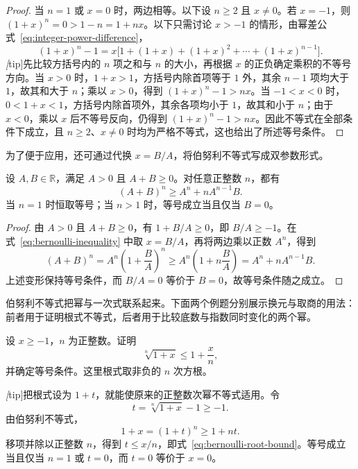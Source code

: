 \begin{proof}
当 $n=1$ 或 $x=0$ 时，两边相等。以下设 $n\geq2$ 且 $x\neq0$。若 $x=-1$，则 $(1+x)^n=0>1-n=1+nx$。以下只需讨论 $x>-1$ 的情形，由幂差公式~\eqref{eq:integer-power-difference}，
\[
    (1+x)^n-1
    =x\bigl[1+(1+x)+(1+x)^2+\cdots+(1+x)^{n-1}\bigr].
\]
\emph[tip]{先比较方括号内的 $n$ 项之和与 $n$ 的大小，再根据 $x$ 的正负确定乘积的不等号方向。}当 $x>0$ 时，$1+x>1$，方括号内除首项等于 $1$ 外，其余 $n-1$ 项均大于 $1$，故其和大于 $n$；乘以 $x>0$，得到 $(1+x)^n-1>nx$。当 $-1<x<0$ 时，$0<1+x<1$，方括号内除首项外，其余各项均小于 $1$，故其和小于 $n$；由于 $x<0$，乘以 $x$ 后不等号反向，仍得到 $(1+x)^n-1>nx$。因此不等式在全部条件下成立，且 $n\geq2$、$x\neq0$ 时均为严格不等式，这也给出了所述等号条件。
\end{proof}

为了便于应用，还可通过代换 $x=B/A$，将伯努利不等式写成双参数形式。

\begin{corollary}[伯努利不等式的双参数形式]
\label{cor:two-parameter-bernoulli}
设 $A,B\in\mathbb{R}$，满足 $A>0$ 且 $A+B\geq0$。对任意正整数 $n$，都有
\begin{equation}
    (A+B)^n\geq A^n+nA^{n-1}B.
    \label{eq:two-parameter-bernoulli}
\end{equation}
当 $n=1$ 时恒取等号；当 $n>1$ 时，等号成立当且仅当 $B=0$。
\end{corollary}

\begin{proof}
由 $A>0$ 且 $A+B\geq0$，有 $1+B/A\geq0$，即 $B/A\geq-1$。在式~\eqref{eq:bernoulli-inequality} 中取 $x=B/A$，再将两边乘以正数 $A^n$，得到
\[
    (A+B)^n=A^n\left(1+\frac BA\right)^n
    \geq A^n\left(1+n\frac BA\right)
    =A^n+nA^{n-1}B.
\]
上述变形保持等号条件，而 $B/A=0$ 等价于 $B=0$，故等号条件随之成立。
\end{proof}

伯努利不等式把幂与一次式联系起来。下面两个例题分别展示换元与取商的用法：前者用于证明根式不等式，后者用于比较底数与指数同时变化的两个幂。

\begin{example}
\label{ex:bernoulli-root-bound}
设 $x\geq-1$，$n$ 为正整数。证明
\begin{equation}
    \sqrt[n]{1+x}\leq1+\frac xn,
    \label{eq:bernoulli-root-bound}
\end{equation}
并确定等号条件。这里根式取非负的 $n$ 次方根。
\end{example}

\begin{solve}
\emph[tip]{把根式设为 $1+t$，就能使原来的正整数次幂不等式适用。}令
\[
    t=\sqrt[n]{1+x}-1\geq-1.
\]
由伯努利不等式，
\[
    1+x=(1+t)^n\geq1+nt.
\]
移项并除以正整数 $n$，得到 $t\leq x/n$，即式~\eqref{eq:bernoulli-root-bound}。等号成立当且仅当 $n=1$ 或 $t=0$，而 $t=0$ 等价于 $x=0$。
\end{solve}

